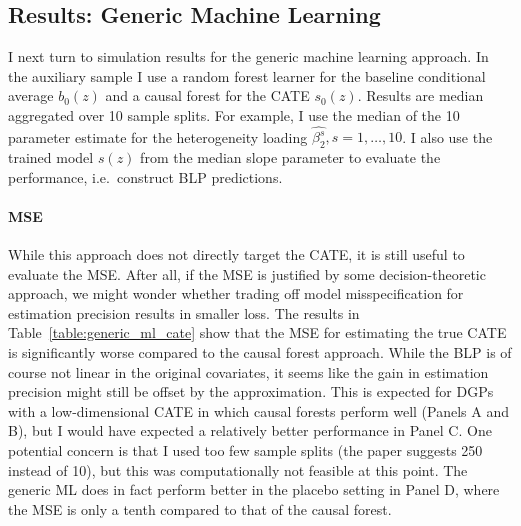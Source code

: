 \documentclass[11pt, a4paper, leqno]{article}
\begin{document}
\subsection{Results: Generic Machine Learning}
I next turn to simulation results for the generic machine learning approach.
In the auxiliary sample I use a random forest learner for the baseline conditional average $b_0(z)$ and a causal forest for the CATE $s_0(z)$.
Results are median aggregated over 10 sample splits. For example, I use the median of the 10 parameter estimate for the heterogeneity loading $\hat{\beta_2^s}, s=1,\ldots,10$.
I also use the trained model $s(z)$ from the median slope parameter to evaluate the performance, i.e.\ construct BLP predictions.

\paragraph*{MSE}
While this approach does not directly target the CATE, it is still useful to evaluate the MSE\@.
After all, if the MSE is justified by some decision-theoretic approach, we might wonder whether trading off model misspecification for estimation precision results in smaller loss.
The results in Table~\ref*{table:generic_ml_cate} show that the MSE for estimating the true CATE is significantly worse compared to the causal forest approach.
While the BLP is of course not linear in the original covariates, it seems like the gain in estimation precision might still be offset by the approximation.
This is expected for DGPs with a low-dimensional CATE in which causal forests perform well (Panels A and B), but I would have expected a relatively better performance in Panel C.
One potential concern is that I used too few sample splits (the paper suggests 250 instead of 10), but this was computationally not feasible at this point.
The generic ML does in fact perform better in the placebo setting in Panel D, where the MSE is only a tenth compared to that of the causal forest.
\end{document}

